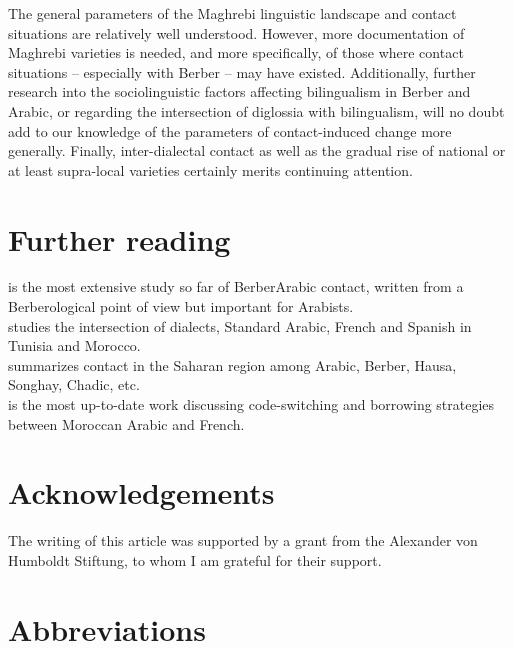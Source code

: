 \documentclass[output=paper]{langsci/langscibook}
\begin{document}
The general parameters of the Maghrebi linguistic landscape and contact situations are relatively well understood. However, more documentation of Maghrebi varieties is needed, and more specifically, of those where contact situations -- especially with Berber -- may have existed. Additionally, further research into the sociolinguistic factors affecting bilingualism in Berber and Arabic, or regarding the intersection of diglossia with bilingualism, will no doubt add to our knowledge of the parameters of contact-induced change more generally. Finally, inter-dialectal contact as well as the gradual rise of national or at least supra-local varieties certainly merits continuing attention.

\section*{Further reading}

\citet{Kossmann2013book} is the most extensive study so far of Berber\textendash Arabic contact, written from a Berberological point of view but important for Arabists.\\
\citet{Sayahi2014} studies the intersection of dialects, Standard Arabic, French and Spanish in Tunisia and Morocco.\\
\citet{Souag2016sahara} summarizes contact in the Saharan region among Arabic, Berber, Hausa, Songhay, Chadic, etc.\\
\citet{Ziamari2008} is the most up-to-date work discussing code-switching and borrowing strategies between Moroccan Arabic and French.

\section*{Acknowledgements} 
The writing of this article was supported by a grant from the Alexander von Humboldt Stiftung, to whom I am grateful for their support.

\section*{Abbreviations}
\end{document}
